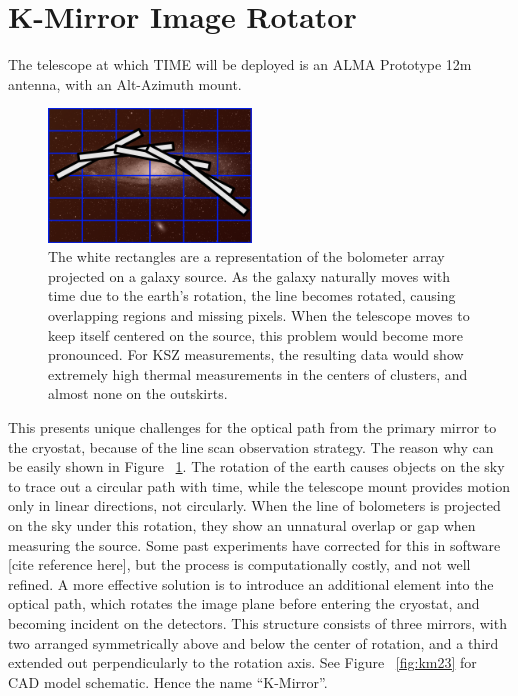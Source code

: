 \documentclass[manuscript]{aastex}
\begin{document}
\section{K-Mirror Image Rotator}
The telescope at which TIME will be deployed is an ALMA Prototype 12m antenna, with an Alt-Azimuth mount. 
\begin{figure}
\vspace{-0.8cm}
  \begin{center}
    \includegraphics[width=0.48\textwidth]{km1.png}
  \end{center}
  \caption[Diagram of Bolometer De-rotation on Source from Alt-Az Mount.]{The white rectangles are a representation of the bolometer array projected on a galaxy source. As the galaxy naturally moves with time due to the earth's rotation, the line becomes rotated, causing overlapping regions and missing pixels. When the telescope moves to keep itself centered on the source, this problem would become more pronounced. For KSZ measurements, the resulting data would show extremely high thermal measurements in the centers of clusters, and almost none on the outskirts.}
  \label{fig:km1}
\end{figure}
This presents unique challenges for the optical path from the primary mirror to the cryostat, because of the line scan observation strategy. The reason why can be easily shown in Figure ~\ref{fig:km1}. The rotation of the earth causes objects on the sky to trace out a circular path with time, while the telescope mount provides motion only in linear directions, not circularly. When the line of bolometers is projected on the sky under this rotation, they show an unnatural overlap or gap when measuring the source. Some past experiments have corrected for this in software [cite reference here], but the process is computationally costly, and not well refined. A more effective solution is to introduce an additional element into the optical path, which rotates the image plane before entering the cryostat, and becoming incident on the detectors. This structure consists of three mirrors, with two arranged symmetrically above and below the center of rotation, and a third extended out perpendicularly to the rotation axis. See Figure ~\ref{fig:km23} for CAD model schematic. Hence the name ``K-Mirror''. 
\end{document}

